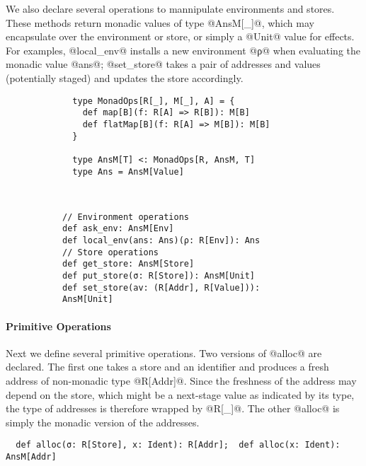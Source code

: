 We also declare several operations to mannipulate environments and
stores. These methods return monadic values of type @AnsM[_]@, which
may encapsulate over the environment or store, or simply a @Unit@
value for effects. For examples, @local_env@ installs a new environment
@ρ@ when evaluating the monadic value @ans@; @set_store@ takes a pair of
addresses and values (potentially staged) and updates the store accordingly.

\begin{figure}[h!]
  \centering
  \begin{subfigure}[b]{0.45\textwidth}
    \begin{lstlisting}
  type MonadOps[R[_], M[_], A] = {
    def map[B](f: R[A] => R[B]): M[B]
    def flatMap[B](f: R[A] => M[B]): M[B]
  }
  
  type AnsM[T] <: MonadOps[R, AnsM, T]
  type Ans = AnsM[Value]
    \end{lstlisting}
  \end{subfigure}
  ~
  \begin{subfigure}[b]{0.55\textwidth}
    \begin{lstlisting}
// Environment operations
def ask_env: AnsM[Env]
def local_env(ans: Ans)(ρ: R[Env]): Ans
// Store operations
def get_store: AnsM[Store]
def put_store(σ: R[Store]): AnsM[Unit]
def set_store(av: (R[Addr], R[Value])): AnsM[Unit]
    \end{lstlisting}
  \end{subfigure}
\end{figure}

\paragraph{Primitive Operations} Next we define several primitive operations.
Two versions of @alloc@ are declared. The first one takes a store and an
identifier and produces a fresh address of non-monadic type @R[Addr]@. Since
the freshness of the address may depend on the store, which might be a
next-stage value as indicated by its type, the type of addresses is therefore
wrapped by @R[_]@. The other @alloc@ is simply the monadic version of the addresses.

\begin{lstlisting}
  def alloc(σ: R[Store], x: Ident): R[Addr];  def alloc(x: Ident): AnsM[Addr]
\end{lstlisting}

